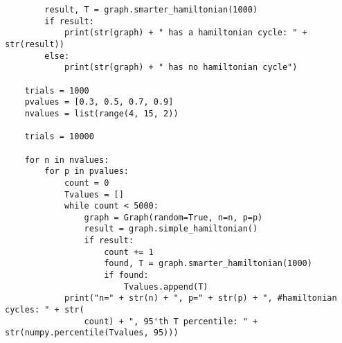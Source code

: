 \documentclass[10pt,a4paper]{report}
\begin{document}
\begin{verbatim}
        result, T = graph.smarter_hamiltonian(1000)
        if result:
            print(str(graph) + " has a hamiltonian cycle: " + str(result))
        else:
            print(str(graph) + " has no hamiltonian cycle")

    trials = 1000
    pvalues = [0.3, 0.5, 0.7, 0.9]
    nvalues = list(range(4, 15, 2))

    trials = 10000

    for n in nvalues:
        for p in pvalues:
            count = 0
            Tvalues = []
            while count < 5000:
                graph = Graph(random=True, n=n, p=p)
                result = graph.simple_hamiltonian()
                if result:
                    count += 1
                    found, T = graph.smarter_hamiltonian(1000)
                    if found:
                        Tvalues.append(T)
            print("n=" + str(n) + ", p=" + str(p) + ", #hamiltonian cycles: " + str(
                count) + ", 95'th T percentile: " + str(numpy.percentile(Tvalues, 95)))
\end{verbatim}
\end{document}
